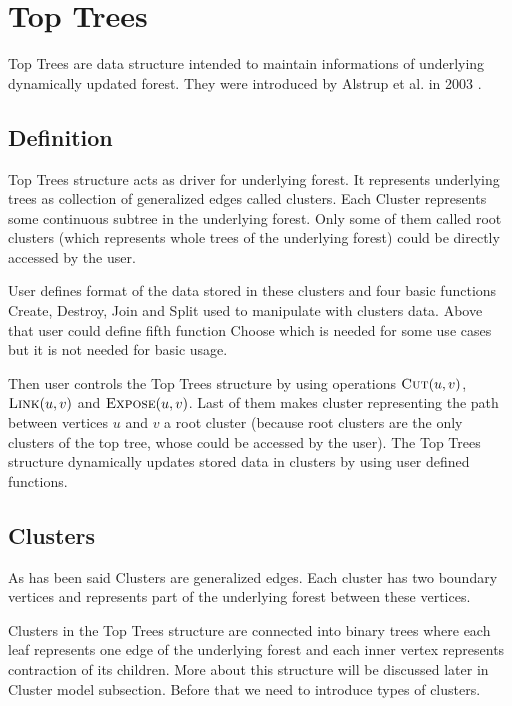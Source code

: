 \chapter{Top Trees}

Top Trees are data structure intended to maintain informations of underlying
dynamically updated forest. They were introduced by Alstrup et al. in 2003 \cite{TopTrees}.

\section{Definition}

{\I Top Trees structure} acts as driver for underlying forest. It represents
underlying trees as collection of generalized edges called {\I clusters}. Each
{\I Cluster} represents some continuous subtree in the underlying forest. Only
some of them called {\I root clusters} (which represents whole trees of the
underlying forest) could be directly accessed by the user.

User defines format of the data stored in these clusters and four basic
functions {\sc Create}, {\sc Destroy}, {\sc Join} and {\sc Split} used to
manipulate with clusters data. Above that user could define fifth function
{\sc Choose} which is needed for some use cases but it is not needed for basic
usage.

Then user controls the Top Trees structure by using operations $\hbox{\sc Cut}(u,v)$,
$\hbox{\sc Link}(u,v)$ and $\hbox{\sc Expose}(u,v)$. Last of them
makes cluster representing the path between vertices $u$ and $v$ a root cluster
(because root clusters are the only clusters of the top tree, whose could be
accessed by the user). The Top Trees structure dynamically updates stored data
in clusters by using user defined functions.




\section{Clusters}

As has been said {\I Clusters} are generalized edges. Each cluster has two
{\I boundary vertices} and represents part of the underlying forest between
these vertices.

Clusters in the Top Trees structure are connected into binary trees where each
leaf represents one edge of the underlying forest and each inner vertex represents
contraction of its children. More about this structure will be discussed
later in {\I Cluster model} subsection. Before that we need to introduce types
of clusters.

